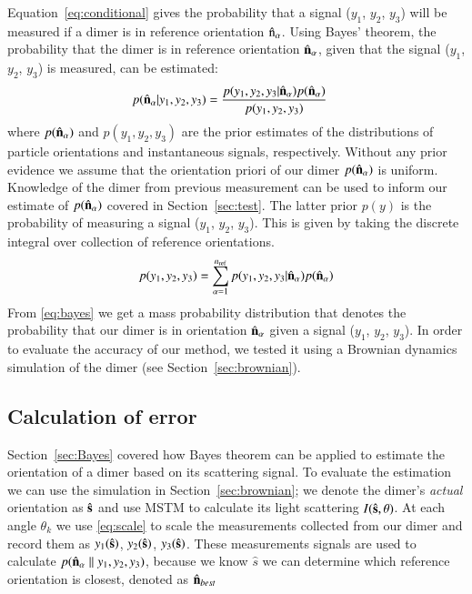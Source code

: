 \documentclass[final, 3p]{elsarticle}
\begin{document}
Equation~\eqref{eq:conditional} gives the probability that a signal
($y_1$, $y_2$, $y_3$) will be measured if a dimer is in reference
orientation $\hat{\rm n}_\alpha$.
%
Using Bayes' theorem, the probability that the dimer is in reference
orientation $\hat{\bf n}_\alpha$, given that the signal ($y_1$, $y_2$,
$y_3$) is measured, can be estimated:
\begin{align}
  \label{eq:bayes}
  p(\hat{\bf n}_\alpha| y_1,y_2,y_3)
  &=
    \frac{p(y_1,y_2,y_3|\hat{\bf n}_\alpha)
    p(\hat{\bf n}_\alpha)}{p(y_1, y_2, y_3)}
\end{align}
where $p(\hat{\bf n}_\alpha)$ and $p(y_1, y_2, y_3)$ are the prior
estimates of the distributions of particle orientations and
instantaneous signals, respectively.
%
Without any prior evidence we assume that the orientation priori of our dimer $p(\hat{\bf n}_{\alpha})$ is uniform. Knowledge of the dimer from previous measurement can be used to inform our estimate of $p(\hat{\bf n}_{\alpha})$ covered in Section~\ref{sec:test}.  The latter prior $p(y)$ is the probability of measuring a signal ($y_1$, $y_2$, $y_3$).  This is given by taking the discrete integral over collection of reference orientations.
\begin{align}
  p(y_1, y_2, y_3)
  =
  \sum_{\alpha=1}^{n_{\rm ref}}
  p(y_1, y_2, y_3|\hat{\bf n}_\alpha)
  p(\hat{\bf n}_\alpha)
\end{align}
From \eqref{eq:bayes} we get a mass probability distribution that denotes the probability that our dimer is in orientation $\hat{\bf n}_{\alpha}$ given a signal ($y_1$, $y_2$, $y_3$). In order to evaluate the accuracy of our method, we tested it using a Brownian dynamics simulation of the dimer (see Section~\ref{sec:brownian}).

\subsection{Calculation of error}
\label{sec:divergence}
Section~\ref{sec:Bayes} covered how Bayes theorem can be applied to estimate the orientation of a dimer based on its scattering signal. To evaluate the estimation we can use the simulation in Section~\ref{sec:brownian}; we denote the dimer's \emph{actual} orientation as $\hat{\bf s}$ and use MSTM to calculate its light scattering $I(\hat{\bf s}, \theta)$. At each angle $\theta_k$ we use \eqref{eq:scale} to scale the measurements collected from our dimer and record them as $y_1(\hat{\bf s})$, $y_2(\hat{\bf s})$, $y_3(\hat{\bf s})$. These measurements signals are used to calculate $p(\hat{\bf n}_{\alpha}\parallel y_1, y_2, y_3)$, because we know $\hat{s}$ we can determine which reference orientation is closest, denoted as $\hat{\bf n}_{best}$
\end{document}
